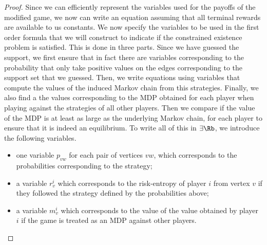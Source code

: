 \begin{proof}
    Since we can efficiently represent the variables used for the payoffs of the modified game, we now can write an equation assuming that all terminal rewards are available to us constants. We now specify the variables to be used in the first order formula that we will construct to indicate if the constrained existence problem is satisfied. This is done in three parts. Since we have guessed the support, we first ensure that in fact there are variables corresponding to the probability that only take positive values on the edges corresponding to the support set that we guessed.  
    Then, we write equations using variables that compute the values of the induced Markov chain from this strategies. Finally, we also find a the values corresponding to the MDP obtained for each player when playing against the strategies of all other players. Then we compare if the value of the MDP is at least as large as the underlying Markov chain, for each player to ensure that it is indeed an equilibrium. To write all of this in $\exists\Rb$, we introduce the following variables. 
     \begin{itemize}
         \item one variable  $p_{vw}$ for each pair of vertices $vw$, which corresponds to the probabilities corresponding to the strategy;
         \item a variable $r^i_v$ which corresponds to the risk-entropy of player $i$ from vertex $v$ if they followed the strategy defined by the probabilities above; 
         \item a variable $m^i_v$ which corresponds to the value of the value obtained by player $i$ if the game is treated as an MDP against other players.
     \end{itemize}
 

\end{proof}
